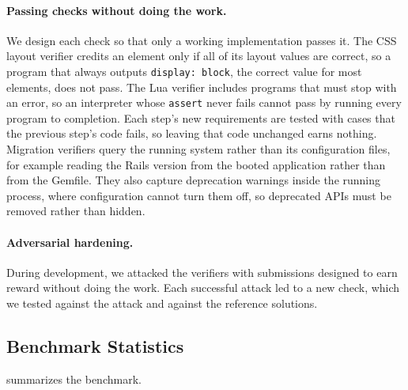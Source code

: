 \documentclass{article}
\begin{document}
\paragraph{Passing checks without doing the work.}
We design each check so that only a working implementation passes it. The CSS
layout verifier credits an element only if all of its layout values are
correct, so a program that always outputs \texttt{display: block}, the correct
value for most elements, does not pass. The Lua verifier includes programs that
must stop with an error, so an interpreter whose \texttt{assert} never fails
cannot pass by running every program to completion. Each step's new requirements are
tested with cases that the previous step's code fails, so leaving that code
unchanged earns nothing. Migration verifiers query the running system rather than its configuration
files, for example reading the Rails version from the booted application rather
than from the Gemfile. They also capture deprecation warnings inside the running
process, where configuration cannot turn them off, so deprecated APIs must be
removed rather than hidden.

\paragraph{Adversarial hardening.}
During development, we attacked the verifiers with submissions designed to earn
reward without doing the work. Each successful attack led to a new check, which
we tested against the attack and against the reference solutions.

\subsection{Benchmark Statistics}
\label{sec:stats}

 summarizes the benchmark.
\end{document}
